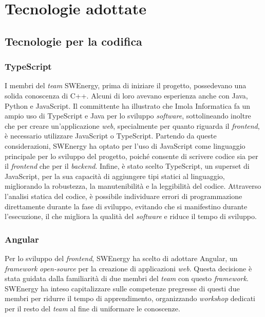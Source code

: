\section{Tecnologie adottate}

\subsection{Tecnologie per la codifica}

\subsubsection{TypeScript}

I membri del \textit{team} SWEnergy, prima di iniziare il progetto, possedevano una
solida conoscenza di C++. Alcuni di loro avevano esperienza anche con Java,
Python e JavaScript. Il committente ha illustrato che Imola Informatica fa un
ampio uso di TypeScript e Java per lo sviluppo \textit{software}, sottolineando
inoltre che per creare un'applicazione \textit{web}, specialmente per quanto riguarda il
\textit{frontend}, è necessario utilizzare JavaScript o TypeScript. Partendo da
queste considerazioni, SWEnergy ha optato per l'uso di JavaScript come
linguaggio principale per lo sviluppo del progetto, poiché consente di scrivere
codice sia per il \textit{frontend} che per il \textit{backend}. Infine, è stato
scelto TypeScript, un superset di JavaScript, per la sua capacità di aggiungere
tipi statici al linguaggio, migliorando la robustezza, la manutenibilità e la
leggibilità del codice. Attraverso l'analisi statica del codice, è possibile
individuare errori di programmazione direttamente durante la fase di sviluppo,
evitando che si manifestino durante l'esecuzione, il che migliora la qualità del
\textit{software} e riduce il tempo di sviluppo.

\subsubsection{Angular}

Per lo sviluppo del \textit{frontend}, SWEnergy ha scelto di adottare Angular,
un \textit{framework} \textit{open-source} per la creazione di applicazioni \textit{web}. Questa
decisione è stata guidata dalla familiarità di due membri del \textit{team} con questo
\textit{framework}. SWEnergy ha inteso capitalizzare sulle competenze pregresse
di questi due membri per ridurre il tempo di apprendimento, organizzando
\textit{workshop} dedicati per il resto del \textit{team} al fine di uniformare le
conoscenze.

